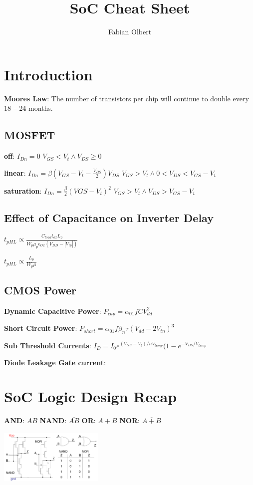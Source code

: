 \documentclass[english]{latex4ei/latex4ei_sheet}
\title{SoC Cheat Sheet}
\author{Fabian Olbert}					%
\begin{document}
\maketitle	%

\section{Introduction}

    \textbf{Moores Law}: The number of transistors per chip will continue to double every 18 – 24 months.

    \subsection{MOSFET}
    \textbf{off}: \qquad $I_{Dn} = 0$ \qquad $V_{GS} < V_t \wedge V_{DS} \geq 0$
    
    \textbf{linear}: \qquad $I_{Dn} = \beta (V_{GS} - V_t - \frac{V_{DS}}{2})V_{DS} $ \qquad $V_{GS} > V_t \wedge  0 < V_{DS} < V_{GS} - V_t$
    
    \textbf{saturation}: \qquad $I_{Dn} = \frac{\beta}{2} (V{GS} - V_t)^2$ \qquad $V_{GS} > V_t \wedge  V_{DS} > V_{GS} - V_t$

    \subsection{Effect of Capacitance on Inverter Delay}
    $t_{pHL} \varpropto \frac{C_{load} t_{ox} L_p}{W_p \mu_p \epsilon_{Ox} (V_{DD} - |V_{tp}|)}$

     $t_{pHL} \varpropto \frac{L_p}{W_p \mu}$
     
    \subsection{CMOS Power}
    \textbf{Dynamic Capacitive Power}: $P_{cap} = \alpha_{01} f C V_{dd}^2$
    
    \textbf{Short Circuit Power}: $P_{short} = \alpha_{01} f \beta_n \tau (V_{dd} - 2 V_{tn})^3$

    \textbf{Sub Threshold Currents}: $I_D = I_0 e^{(V_{GS} - V_t) / n V_{temp}} (1 - e^{-V_{DS} / V_{temp}}$

    \textbf{Diode Leakage Gate current}:



\section{SoC Logic Design Recap}
\textbf{AND}: $A B$
\textbf{NAND}: $\overline{A B}$
\textbf{OR}: $A + B$
\textbf{NOR}: $\overline{A + B}$
\begin{center}
    \includegraphics[width = 5cm ]{images/2. SoC Logic Design Recap/NandNor.png}
\end{center}
\end{document}
